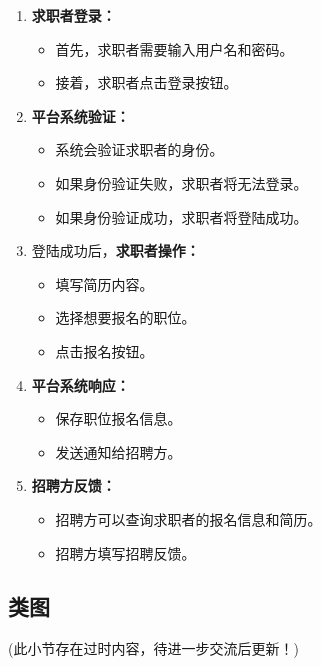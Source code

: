 \documentclass[UTF8,a4paper,10pt]{ctexart}
\begin{document}
\begin{enumerate}
    \item \textbf{求职者登录：}
        \begin{itemize}
            \item 首先，求职者需要输入用户名和密码。
            \item 接着，求职者点击登录按钮。
        \end{itemize}
    
    \item \textbf{平台系统验证：}
        \begin{itemize}
            \item 系统会验证求职者的身份。
            \item 如果身份验证失败，求职者将无法登录。
            \item 如果身份验证成功，求职者将登陆成功。
        \end{itemize}
    
    \item 登陆成功后，\textbf{求职者操作：}
        \begin{itemize}
            \item 填写简历内容。
            \item 选择想要报名的职位。
            \item 点击报名按钮。
        \end{itemize}
    
    \item \textbf{平台系统响应：}
        \begin{itemize}
            \item 保存职位报名信息。
            \item 发送通知给招聘方。
        \end{itemize}
    
    \item \textbf{招聘方反馈：}
        \begin{itemize}
            \item 招聘方可以查询求职者的报名信息和简历。
            \item 招聘方填写招聘反馈。
        \end{itemize}
\end{enumerate}

\subsection{类图}

(此小节存在过时内容，待进一步交流后更新！)
\end{document}
